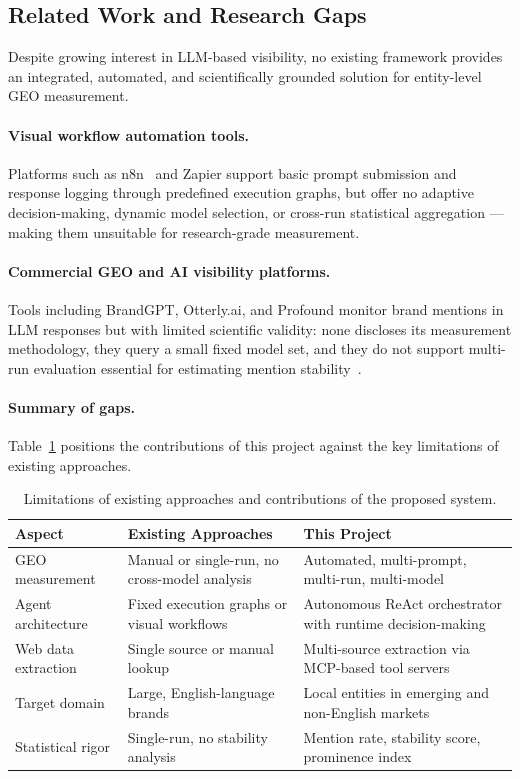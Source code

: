 \subsection{Related Work and Research Gaps}
\label{sec:related_work}

Despite growing interest in LLM-based visibility, no existing framework provides an
integrated, automated, and scientifically grounded solution for entity-level GEO
measurement.

\paragraph{Visual workflow automation tools.}
Platforms such as n8n~\cite{n8n2024} and Zapier support basic prompt submission and
response logging through predefined execution graphs, but offer no adaptive
decision-making, dynamic model selection, or cross-run statistical aggregation —
making them unsuitable for research-grade measurement.

\paragraph{Commercial GEO and AI visibility platforms.}
Tools including BrandGPT, Otterly.ai, and Profound monitor brand mentions in LLM
responses but with limited scientific validity: none discloses its measurement
methodology, they query a small fixed model set, and they do not support multi-run
evaluation essential for estimating mention stability~\cite{aggarwal2023geo}.

\paragraph{Summary of gaps.}
Table~\ref{tab:gaps} positions the contributions of this project against the key
limitations of existing approaches.

\begin{table}[H]
\centering
\caption{Limitations of existing approaches and contributions of the proposed system.}
\label{tab:gaps}
\begin{tabular}{|p{3.0cm}|p{4.6cm}|p{4.6cm}|}
\hline
\textbf{Aspect} & \textbf{Existing Approaches} & \textbf{This Project} \\
\hline
GEO measurement &
Manual or single-run, no cross-model analysis &
Automated, multi-prompt, multi-run, multi-model \\
\hline
Agent architecture &
Fixed execution graphs or visual workflows &
Autonomous ReAct orchestrator with runtime decision-making \\
\hline
Web data extraction &
Single source or manual lookup &
Multi-source extraction via MCP-based tool servers \\
\hline
Target domain &
Large, English-language brands &
Local entities in emerging and non-English markets \\
\hline
Statistical rigor &
Single-run, no stability analysis &
Mention rate, stability score, prominence index \\
\hline
\end{tabular}
\end{table}

